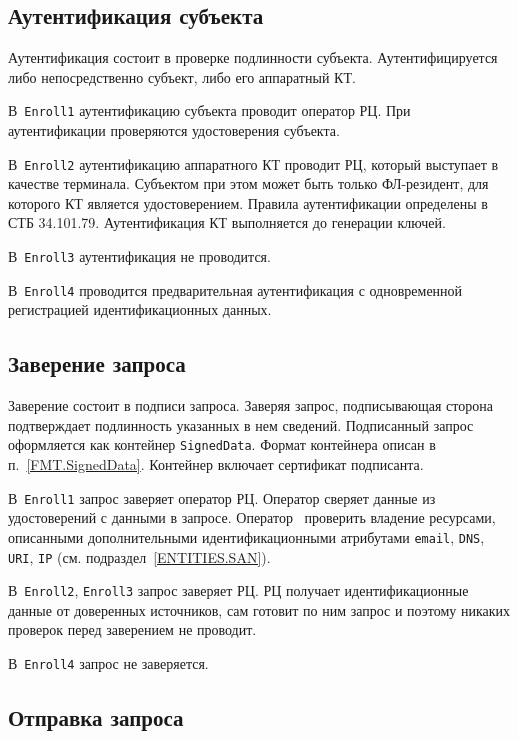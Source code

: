 \subsection{Аутентификация субъекта}\label{PROCESSES.Enroll.Auth}

Аутентификация состоит в проверке подлинности субъекта.
Аутентифицируется либо непосредственно субъект, либо его аппаратный КТ. 

В~\texttt{Enroll1} аутентификацию субъекта проводит оператор РЦ.
При аутентификации проверяются удостоверения субъекта. 

В~\texttt{Enroll2} аутентификацию аппаратного КТ проводит РЦ, который 
выступает в качестве терминала. Субъектом при этом может быть только 
ФЛ-резидент, для которого КТ является удостоверением. Правила 
аутентификации определены в СТБ 34.101.79. 
Аутентификация КТ выполняется до генерации ключей. 

В~\texttt{Enroll3} аутентификация не проводится.

В~\texttt{Enroll4} проводится предварительная аутентификация
с одновременной регистрацией идентификационных данных.

\subsection{Заверение запроса}\label{PROCESSES.Enroll.Signed}

Заверение состоит в подписи запроса. Заверяя запрос,
подписывающая сторона подтверждает подлинность указанных в нем сведений.
Подписанный запрос оформляется как контейнер \texttt{SignedData}.
Формат контейнера описан в п.~\ref{FMT.SignedData}. 
Контейнер включает сертификат подписанта.

В~\texttt{Enroll1} запрос заверяет оператор РЦ.
Оператор сверяет данные из удостоверений с данными в запросе.
%
Оператор~ проверить владение ресурсами, описанными
дополнительными идентификационными атрибутами \texttt{email}, \texttt{DNS},
\texttt{URI}, \texttt{IP} (см. подраздел~\ref{ENTITIES.SAN}).

В~\texttt{Enroll2}, \texttt{Enroll3} запрос заверяет РЦ.
РЦ получает идентификационные данные от доверенных источников,
сам готовит по ним запрос и поэтому никаких проверок перед заверением
не проводит.

В~\texttt{Enroll4} запрос не заверяется.

\subsection{Отправка запроса}\label{PROCESSES.Enroll.Enveloped}

